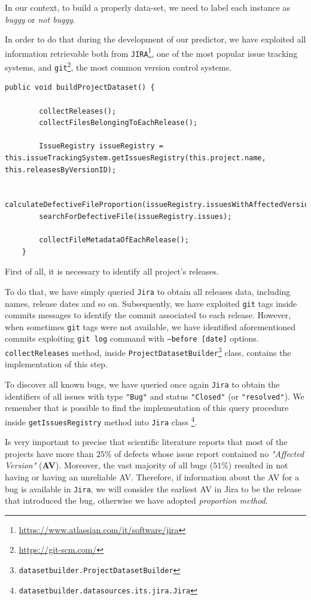 \documentclass[sigconf]{acmart}
\begin{document}
In our context, to build a properly data-set, we need to label each instance as \textit{buggy} or \textit{not buggy}. 

In order to do that during the development of our predictor, we have exploited all information retrievable both from \texttt{JIRA}\footnote{\url{https://www.atlassian.com/it/software/jira}}, one of the most popular issue tracking systems, and \texttt{git}\footnote{\url{https://git-scm.com/}}, the most common version control systems.

\begin{lstlisting}[frame=lines,basicstyle=\ttfamily\tiny, caption={Dataset build logic}, label={buildProjectDataset}]
public void buildProjectDataset() {

        collectReleases();
        collectFilesBelongingToEachRelease();

        IssueRegistry issueRegistry = this.issueTrackingSystem.getIssuesRegistry(this.project.name, this.releasesByVersionID);

        calculateDefectiveFileProportion(issueRegistry.issuesWithAffectedVersions);
        searchForDefectiveFile(issueRegistry.issues);

        collectFileMetadataOfEachRelease();
    }
\end{lstlisting}

First of all, it is necessary to identify all project's releases.

To do that, we have simply queried \texttt{Jira} to obtain all releases data, including names, release dates and so on. Subsequently, we have exploited \texttt{git} tags inside commits messages to identify the commit associated to each release. However, when sometimes \texttt{git} tags were not available, we have identified aforementioned commits exploiting \texttt{git log} command with \texttt{--before [date]} options. \texttt{collectReleases} method, inside \texttt{ProjectDatasetBuilder}\footnote{\texttt{datasetbuilder.ProjectDatasetBuilder}} class, contains the implementation of this step.

To discover all known bugs, we have queried once again \texttt{Jira} to obtain the identifiers of all issues with type \texttt{"Bug"} and status \texttt{"Closed"} (or \texttt{"resolved"}). We remember that is possible to find the implementation of this query procedure inside \texttt{getIssuesRegistry} method into \texttt{Jira} class \footnote{\texttt{datasetbuilder.datasources.its.jira.Jira}}.

Is very important to precise that scientific literature reports that most of the projects have more than $25\%$ of defects whose issue report contained no \textit{"Affected Version"} (\textbf{AV}). Moreover, the vast majority of all bugs ($51\%$) resulted in not having or having an unreliable AV. Therefore, if information about the AV for a bug is available in \texttt{Jira}, we will consider the earliest AV in Jira to be the release that introduced the bug, otherwise we have adopted \textit{proportion method}.
\end{document}
